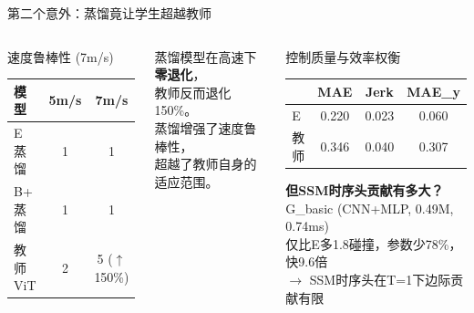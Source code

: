 \documentclass[aspectratio=169,10pt]{beamer}
\newcommand{\pos}[1]{\textcolor{positive}{#1}}
\newcommand{\con}[1]{\textcolor{negative}{#1}}
\newcommand{\HL}[1]{\textcolor{emphasis}{#1}}
\begin{document}
\begin{frame}{第二个意外：蒸馏竟让学生超越教师}
\begin{columns}[T]
\begin{block}{速度鲁棒性 (7m/s)}
\centering\footnotesize
\begin{tabular}{lcc}
\toprule
模型 & 5m/s & 7m/s \\
\midrule
\HL{E 蒸馏} & 1 & \HL{1} \\
\HL{B+ 蒸馏} & 1 & \HL{1} \\
教师 ViT & 2 & \con{5} ($\uparrow$150\%) \\
\bottomrule
\end{tabular}
\end{block}
\vspace{0.2cm}
\footnotesize
蒸馏模型在高速下\textbf{零退化}，\\
教师反而退化150\%。\\
\pos{蒸馏增强了速度鲁棒性，}\\
\pos{超越了教师自身的适应范围。}

\begin{block}{控制质量与效率权衡}
\centering\footnotesize
\begin{tabular}{lccc}
\toprule
& MAE & Jerk & MAE\_y \\
\midrule
\HL{E} & \HL{0.220} & \HL{0.023} & \HL{0.060} \\
教师 & 0.346 & 0.040 & 0.307 \\
\bottomrule
\end{tabular}
\vspace{0.15cm}
\textbf{但SSM时序头贡献有多大？}\\
G\_basic (CNN+MLP, 0.49M, 0.74ms)\\
仅比E多1.8碰撞，参数少78\%，快9.6倍\\
$\to$ SSM时序头在T=1下边际贡献有限
\end{block}
\end{columns}
\end{frame}
\end{document}
